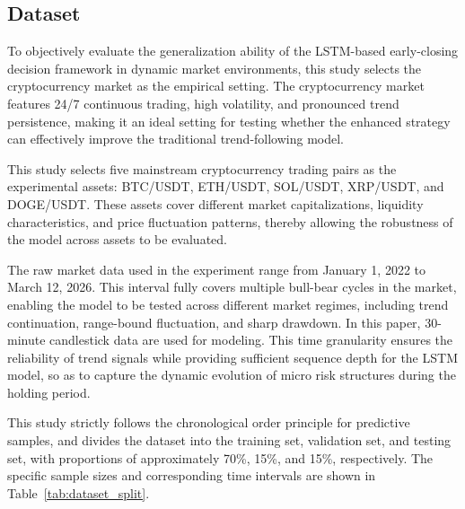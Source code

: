 \documentclass[12pt]{article}
\begin{document}
\subsection{Dataset}

To objectively evaluate the generalization ability of the LSTM-based early-closing decision 
framework in dynamic market environments, this study selects the cryptocurrency market as the 
empirical setting. The cryptocurrency market features 24/7 continuous trading, high volatility, 
and pronounced trend persistence, making it an ideal setting for testing whether the enhanced 
strategy can effectively improve the traditional trend-following model.

This study selects five mainstream cryptocurrency trading pairs as the 
experimental assets: BTC/USDT, ETH/USDT, SOL/USDT, XRP/USDT, and DOGE/USDT. These assets cover 
different market capitalizations, liquidity characteristics, and price fluctuation patterns, 
thereby allowing the robustness of the model across assets to be evaluated.

The raw market data used in the experiment range from January 1, 2022 to March 12, 2026. This 
interval fully covers multiple bull-bear cycles in the market, enabling the model to be tested 
across different market regimes, including trend continuation, range-bound fluctuation, and 
sharp drawdown. In this paper, 30-minute candlestick data are used for modeling. This time 
granularity ensures the reliability of trend signals while providing sufficient sequence depth 
for the LSTM model, so as to capture the dynamic evolution of micro risk structures during the 
holding period.

This study strictly follows the chronological order principle for predictive samples, and 
divides the dataset into the training set, validation set, and testing set, with proportions of 
approximately 70\%, 15\%, and 15\%, respectively. The specific sample sizes and corresponding 
time intervals are shown in Table~\ref{tab:dataset_split}.
\end{document}
